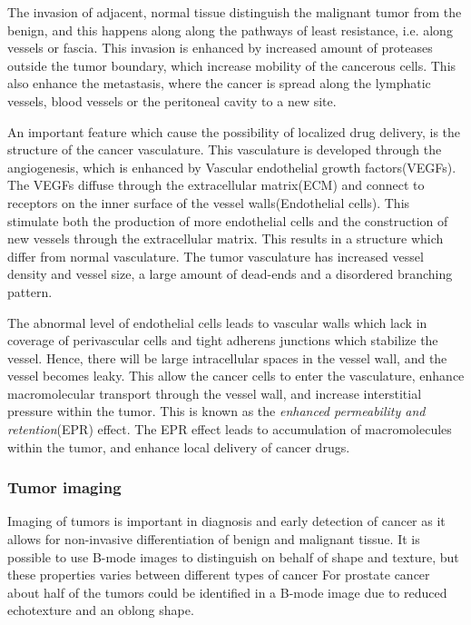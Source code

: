 The invasion of adjacent, normal tissue distinguish the malignant tumor from the benign, and this happens along along the pathways of least resistance, i.e. along vessels or fascia. This invasion is enhanced by increased amount of proteases outside the tumor boundary, which increase mobility of the cancerous cells. This also enhance the metastasis, where the cancer is spread along the lymphatic vessels, blood vessels or the peritoneal cavity to a new site.
 
An important feature which cause the possibility of localized drug delivery, is the structure of the cancer vasculature. This vasculature is developed through the angiogenesis, which is enhanced by Vascular endothelial growth factors(VEGFs). The VEGFs diffuse through the extracellular matrix(ECM) and connect to receptors on the inner surface of the vessel walls(Endothelial cells)\cite{Koumoutsakos2013}. This stimulate both the production of more endothelial cells and the construction of new vessels through the extracellular matrix\cite{Nishida2006}. This results in a structure which differ from normal vasculature. The tumor vasculature has increased vessel density and vessel size, a large amount of dead-ends and a disordered branching pattern.    

The abnormal level of endothelial cells leads to vascular walls which lack in coverage of perivascular cells and tight adherens junctions which stabilize the vessel. Hence, there will be large intracellular spaces in the vessel wall, and the vessel becomes leaky. This allow the cancer cells to enter the vasculature, enhance macromolecular transport through the vessel wall, and increase interstitial pressure within the tumor. This is known as the \textit{enhanced permeability and retention}(EPR) effect. The EPR effect leads to accumulation of macromolecules within the tumor, and enhance local delivery of cancer drugs.



\subsubsection{Tumor imaging}
Imaging of tumors is important in diagnosis and early detection of cancer as it allows for non-invasive differentiation of benign and malignant tissue. It is possible to use B-mode images to distinguish on behalf of shape and texture, but these properties varies between different types of cancer For prostate cancer about half of the tumors could be identified in a B-mode image due to reduced echotexture and an oblong shape\cite{Halpern2006}. 

